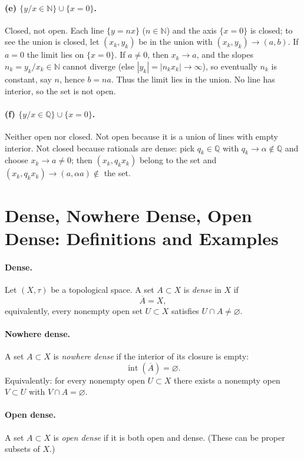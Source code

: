 \documentclass[12pt,a4paper]{article}
\begin{document}
\paragraph{(e) $\{y/x\in\mathbb{N}\}\cup\{x=0\}$.}
Closed, not open. Each line $\{y=nx\}$ ($n\in\mathbb{N}$) and the axis $\{x=0\}$ is closed; to see the union is closed, let $(x_k,y_k)$ be in the union with $(x_k,y_k)\to (a,b)$. If $a=0$ the limit lies on $\{x=0\}$. If $a\ne0$, then $x_k\to a$, and the slopes $n_k=y_k/x_k\in\mathbb{N}$ cannot diverge (else $|y_k|=|n_k x_k|\to\infty$), so eventually $n_k$ is constant, say $n$, hence $b=na$. Thus the limit lies in the union. No line has interior, so the set is not open.

\paragraph{(f) $\{y/x\in\mathbb{Q}\}\cup\{x=0\}$.}
Neither open nor closed. Not open because it is a union of lines with empty interior. Not closed because rationals are dense: pick $q_k\in\mathbb{Q}$ with $q_k\to \alpha\notin\mathbb{Q}$ and choose $x_k\to a\ne0$; then $(x_k,q_k x_k)$ belong to the set and $(x_k,q_k x_k)\to (a,\alpha a)\notin$ the set.

\section*{Dense, Nowhere Dense, Open Dense: Definitions and Examples}

\paragraph{Dense.}
Let $(X,\tau)$ be a topological space. A set $A\subset X$ is \emph{dense} in $X$ if
\[
\overline{A}=X,
\]
equivalently, every nonempty open set $U\subset X$ satisfies $U\cap A\neq\varnothing$.

\paragraph{Nowhere dense.}
A set $A\subset X$ is \emph{nowhere dense} if the interior of its closure is empty:
\[
\operatorname{int}(\overline{A})=\varnothing.
\]
Equivalently: for every nonempty open $U\subset X$ there exists a nonempty open $V\subset U$ with
$V\cap A=\varnothing$.

\paragraph{Open dense.}
A set $A\subset X$ is \emph{open dense} if it is both open and dense. (These can be proper subsets of $X$.)
\end{document}
